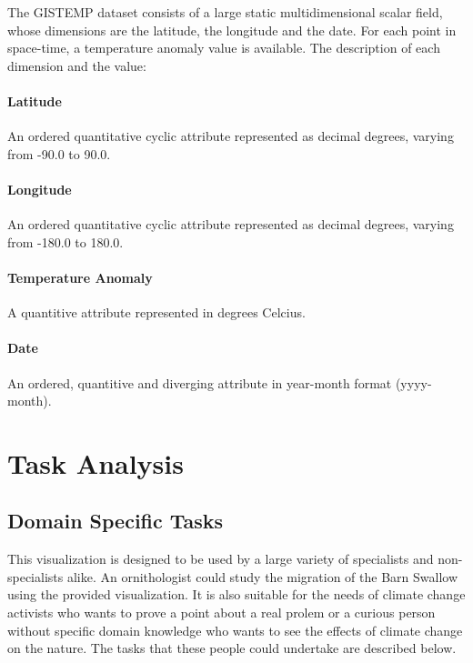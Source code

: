 \documentclass[journal]{vgtc}                %
\begin{document}
The GISTEMP dataset \cite{gistemp} consists of a large static multidimensional scalar field, whose dimensions are the latitude, the longitude and the date. For each point in space-time, a temperature anomaly value is available. The description of each dimension and the value:

\paragraph{Latitude} An ordered quantitative cyclic attribute represented as decimal degrees, varying from -90.0 to 90.0.

\paragraph{Longitude} An ordered quantitative cyclic attribute represented as decimal degrees, varying from -180.0 to 180.0.

\paragraph{Temperature Anomaly} A quantitive attribute represented in degrees Celcius.

\paragraph{Date} An ordered, quantitive and diverging attribute in year-month format (yyyy-month).

\section{Task Analysis}

\subsection{Domain Specific Tasks}
This visualization is designed to be used by a large variety of specialists and non-specialists alike. An ornithologist could study the migration of the Barn Swallow using the provided visualization. It is also suitable for the needs of climate  change activists who wants to prove a point about a real prolem or a curious person without specific domain knowledge who wants to see the effects of climate change on the nature. The tasks that  these people could undertake are described below.
\end{document}

